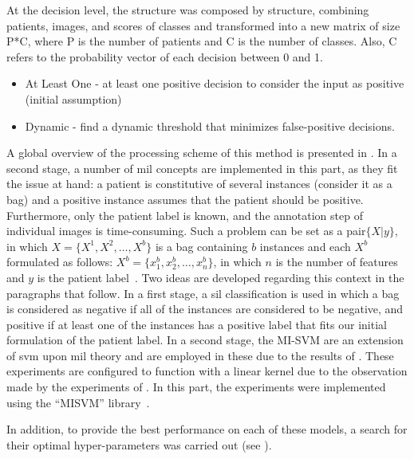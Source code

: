 \documentclass[journal,article,accept,moreauthors,pdftex, applsci]{Definitions/mdpi}
\begin{document}
At the decision level, the structure was composed by structure, combining patients, images, and scores of classes and transformed into a new matrix of size P*C, where P is the number of patients and C is the number of classes. Also, C refers to the probability vector of each decision between 0 and 1.
\begin{itemize}
\item At Least One - at least one positive decision to consider the input as positive (initial assumption)
\item Dynamic - find a dynamic threshold that minimizes false-positive decisions.
\end{itemize}
A global overview of the processing scheme of this method is presented in .
In a second stage, a number of \ac{mil} concepts are implemented in this part, as they fit the issue at hand: a patient is constitutive of several instances (consider it as a bag) and a positive instance assumes that the patient should be positive. Furthermore, only the patient label is known, and the annotation step of individual images is time-consuming. Such a problem can be set as a pair\(\{X|y\}\), in which \(X=\{X^1,X^2,\ldots,X^b\}\) is a bag containing \(b\) instances and each \(X^b\) formulated as follows: \(X^b=\{x^b_1,x^b_2,\ldots,x^b_n\}\), in which \(n\) is the number of features and \(y\) is the patient label~\cite{foulds_frank_2010}. Two ideas are developed regarding this context in the paragraphs that follow. In a first stage, a \ac{sil} classification is used in which a bag is considered as negative if all of the instances are considered to be negative, and positive if at least one of the instances has a positive label that fits our initial formulation of the patient label. In a second stage, the MI-SVM are an extension of \ac{svm} upon \ac{mil} theory and are employed in these due to the results of . These experiments are configured to function with a linear kernel due to the observation made by the experiments of . In this part, the experiments were implemented using the “MISVM” library~\cite{Doran2014}.\par
In addition, to provide the best performance on each of these models, a search for their optimal hyper-parameters was carried out (see ).\par
\end{document}
